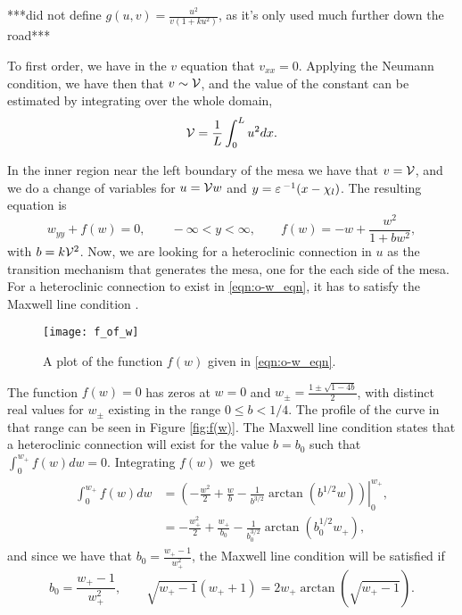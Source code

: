 ***did not define $g(u,v)=\frac{u^2}{v(1+ku^2)}$, as it's only used much further down the road***

To first order, we have in the $v$ equation that $v_{xx}=0$. Applying the Neumann condition, we have then that $v\sim\mathcal{V}$, and the value of the constant can be estimated by integrating over the whole domain,
% 
\begin{equation}
\label{eqn:o-v_first_order}
  \mathcal{V} = \frac{1}{L}\int_0^Lu^2dx.
\end{equation}
% 

In the inner region near the left boundary of the mesa we have that $v=\mathcal{V}$, and we do a change of variables for $u=\mathcal{V} w$ and $y=\varepsilon\,^{-1}(x-\chi_l)$. The resulting equation is
% 
\begin{equation}
\label{eqn:o-w_eqn}
  w_{yy}+f(w)=0, \qquad -\infty<y<\infty,\qquad f(w) = -w + \frac{w^2}{1+bw^2},
\end{equation}
% 
with $b = k\mathcal{V}^2$. Now, we are looking for a heteroclinic connection in $u$ as the transition mechanism that generates the mesa, one for the each side of the mesa. For a heteroclinic connection to exist in \eqref{eqn:o-w_eqn}, it has to satisfy the Maxwell line condition \cite{maxwell1994}.
% 
\begin{figure}[htb]
\begin{center}
\texttt{[image: f\_of\_w]}
\caption{A plot of the function $f(w)$ given in \eqref{eqn:o-w_eqn}.}
\label{fig:f(w)}
\end{center}
\end{figure}
% 

The function $f(w)=0$ has zeros at $w=0$ and $w_{\pm} = \frac{1\pm\sqrt{1-4b}}{2}$, with distinct real values for $w_{\pm}$ existing in the range $0\le b<1/4$. The profile of the curve in that range can be seen in Figure \eqref{fig:f(w)}. The Maxwell line condition states that a heteroclinic connection will exist for the value $b=b_0$ such that $\int_0^{w_+} f(w)dw = 0$. Integrating $f(w)$ we get
% 
\begin{equation*}
\begin{split}
\begin{aligned}
  \int_0^{w_+} f(w)dw &= \left.\left(-\frac{w^2}{2} + \frac{w}{b} - \frac{1}{b^{3/2}}\arctan(b^{1/2}w) \right)\right|_0^{w_+},\\
  & = -\frac{w_+^2}{2} + \frac{w_+}{b_0} - \frac{1}{b_0^{3/2}}\arctan(b_0^{1/2}w_+),
\end{aligned}
\end{split}
\end{equation*}
% 
and since we have that $b_0 = \frac{w_+-1}{w_+^2}$, the Maxwell line condition will be satisfied if
% 
\begin{equation}
\label{eqn:maxwell2}
b_0 = \frac{w_+-1}{w_+^2},\qquad \sqrt{w_+-1}(w_++1)=2w_+\arctan(\sqrt{w_+-1}).
\end{equation}

